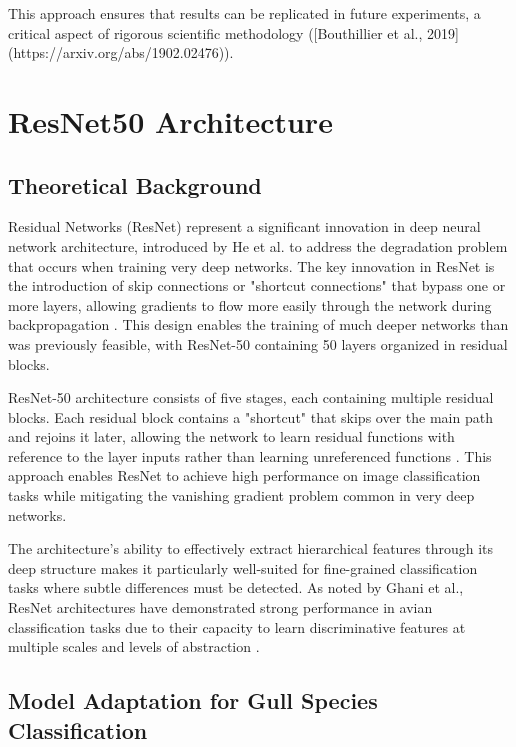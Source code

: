 \documentclass[a4paper,12pt]{article}
\begin{document}

This approach ensures that results can be replicated in future experiments, a critical aspect of rigorous scientific methodology ([Bouthillier et al., 2019](https://arxiv.org/abs/1902.02476)).

\section{ResNet50 Architecture}

\subsection{Theoretical Background}

Residual Networks (ResNet) represent a significant innovation in deep neural network architecture, introduced by He et al. to address the degradation problem that occurs when training very deep networks. The key innovation in ResNet is the introduction of skip connections or "shortcut connections" that bypass one or more layers, allowing gradients to flow more easily through the network during backpropagation \citep{he2016deep}. This design enables the training of much deeper networks than was previously feasible, with ResNet-50 containing 50 layers organized in residual blocks.

ResNet-50 architecture consists of five stages, each containing multiple residual blocks. Each residual block contains a "shortcut" that skips over the main path and rejoins it later, allowing the network to learn residual functions with reference to the layer inputs rather than learning unreferenced functions \citep{he2016deep, he2016identity}. This approach enables ResNet to achieve high performance on image classification tasks while mitigating the vanishing gradient problem common in very deep networks.

The architecture's ability to effectively extract hierarchical features through its deep structure makes it particularly well-suited for fine-grained classification tasks where subtle differences must be detected. As noted by Ghani et al., ResNet architectures have demonstrated strong performance in avian classification tasks due to their capacity to learn discriminative features at multiple scales and levels of abstraction \citep{ghani2024comprehensive}.

\subsection{Model Adaptation for Gull Species Classification}
\end{document}
